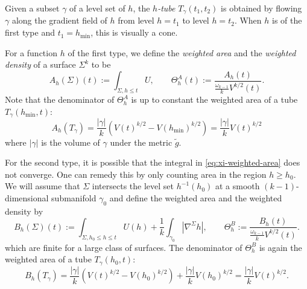 \documentclass[11pt]{article}
\begin{document}
Given a subset \(\gamma\) of a level set of \(h\), the \emph{\(h\)-tube} \(T_{\gamma}(t_1, t_2)\) is obtained by flowing \(\gamma\) along the
gradient field of \(h\) from level \(h=t_1\) to level \(h=t_2\). When \(h\) is of the first type and \(t_1=h_{\min}\), this is visually a cone.

For a function \(h\) of the first type, we define the \emph{weighted area} and the \emph{weighted density} of a surface \(\Sigma^k\) to be
\begin{equation}
\label{eq:xi-weighted-area}
 A_h(\Sigma)(t) := \int_{\Sigma,h\leq t}U,\qquad \Theta^A_h(t) := \frac{A_h(t)}{\frac{\omega_{k-1}}{k}V^{k/2}(t)}.
\end{equation}
Note that the denominator of \(\Theta_h^A\) is up to constant the weighted area of
a tube \(T_\gamma(h_{\min},t)\):
\begin{equation}
\label{eq:area-tube-1}
A_h(T_\gamma)= \frac{|\gamma|}{k} \left(V(t)^{k/2}- V(h_{\min})^{k/2}\right) = \frac{|\gamma|}{k} V(t)^{k/2}
\end{equation}
where \(|\gamma|\) is the volume of \(\gamma\) under the metric \(\tilde g\).

For the second type, it is possible that the integral
in \eqref{eq:xi-weighted-area} does not converge. One can remedy this by only counting
area in the region \(h\geq h_0\). We will assume that \(\Sigma\) intersects
the level set \(h^{-1}(h_0)\) at a smooth \((k-1)\)-dimensional submanifold \(\gamma_0\) and define the weighted area and the weighted density by
\begin{equation}
\label{eq:xi-weighted-area-plus}
B_h(\Sigma)(t):= \int_{\Sigma,h_0\leq h\leq t}U(h) + \frac{1}{k}\int_{\gamma_0}|\nabla^\Sigma h|,\qquad \Theta_h^B:=
\frac{B_h(t)}{\frac{\omega_{k-1}}{k}V^{k/2}(t)}.
\end{equation}
which are finite for a large class of surfaces. The denominator of \(\Theta^B_h\) is again the
weighted area of a tube \(T_\gamma(h_0,t)\):
\begin{equation}
\label{eq:area-tube-2}
 B_h(T_\gamma)= \frac{|\gamma|}{k}(V(t)^{k/2} - V(h_0)^{k/2}) + \frac{|\gamma|}{k}V(h_0)^{k/2} = \frac{|\gamma|}{k}V(t)^{k/2}.
\end{equation}
\end{document}
